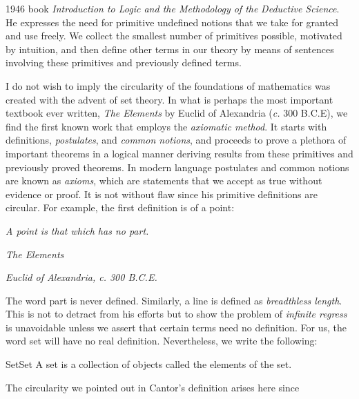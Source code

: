         1946 book \textit{Introduction to Logic and the Methodology of the}
        \textit{Deductive Science}. He expresses the need for primitive
        undefined notions that we take for granted and use freely. We collect
        the smallest number of primitives possible, motivated by intuition, and
        then define other terms in our theory by means of sentences involving
        these primitives and previously defined terms.
        \par\hfill\par
        I do not wish to imply the circularity of the foundations of
        mathematics was created with the advent of set theory. In what is
        perhaps the most important textbook ever written,
        \textit{The Elements} by Euclid of
        Alexandria (\textit{c.} 300 B.C.E), we find the first known work
        that employs the \textit{axiomatic method}. It
        starts with definitions, \textit{postulates}, and
        \textit{common notions}, and proceeds to prove a plethora of important
        theorems in a logical manner deriving results from these primitives and
        previously proved theorems. In modern language postulates and common
        notions are known as \textit{axioms}, which are statements that we
        accept as true without evidence or proof. It is not without flaw since
        his primitive definitions are circular. For example, the
        first definition is of a point:
        \begin{center}
            \textit{A point is that which has no part.}
            \par
            \hfill\textit{The Elements}\par
            \hfill\textit{Euclid of Alexandria, c. 300 B.C.E.}
        \end{center}
        The word part is never defined. Similarly, a line is defined as
        \textit{breadthless length}. This is not to detract from his efforts but
        to show the problem of \textit{infinite regress}
        is unavoidable unless we assert that certain terms need no definition.
        For us, the word set will have no real definition. Nevertheless, we
        write the following:
        \begin{fdefinition}{Set}{Set}
            A \gls{set} is a collection of objects called the elements of the
            set.
        \end{fdefinition}
        The circularity we pointed out in Cantor's definition arises here since
